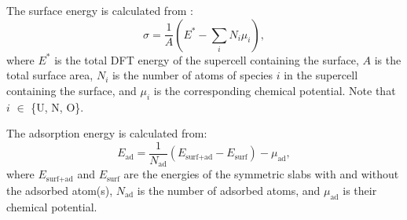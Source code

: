 \documentclass[preprint,12pt,sort&compress]{elsarticle}
\newcommand{\?}{\stackrel{?}{=}}
\begin{document}
The surface energy is calculated from \cite{Finnis2005}:
\begin{equation}
\sigma = \frac{1}{A} \left( E^* - \sum_{i} N_i \mu_i \right),
\label{Eq:Sigma}
\end{equation}
where $E^*$ is the total DFT energy of the supercell containing the surface, $A$ is the total surface area, $N_i$ is the number of atoms of species $i$ in the supercell containing the surface, and $\mu_i$ is the corresponding chemical potential. Note that $i$ $\in$ \{U, N, O\}.

The adsorption energy is calculated from:
\begin{equation}
E_\text{ad} = \frac{1}{N_\text{ad}} \left( E_\text{surf+ad} - E_\text{surf} \right) - \mu_\text{ad},
\label{Eq:Ead}
\end{equation}
where $E_\text{surf+ad}$ and $E_\text{surf}$ are the energies of the symmetric slabs with and without the adsorbed atom(s), $N_\text{ad}$ is the number of adsorbed atoms, and $\mu_\text{ad}$ is their chemical potential. 
\end{document}
